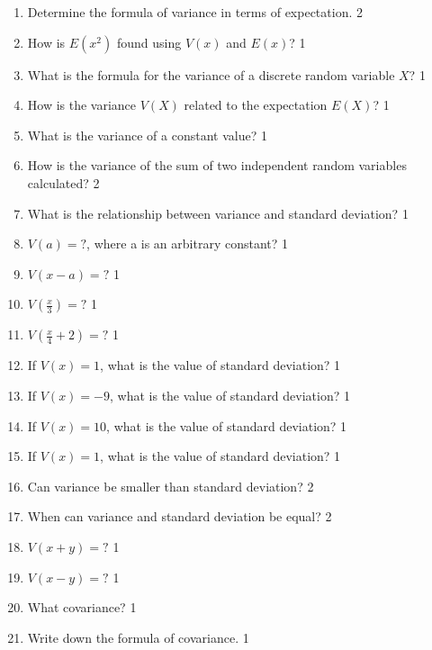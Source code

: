 \documentclass[a4paper,oneside]{book}
\begin{document}
\begin{enumerate}
 \item Determine the formula of variance in terms of expectation. \hfill 2

\item How is \( E(x^2) \) found using \( V(x) \) and \( E(x) \)? \hfill 1

\item What is the formula for the variance of a discrete random variable \( X \)? \hfill 1

\item How is the variance \( V(X) \) related to the expectation \( E(X) \)? \hfill 1

\item What is the variance of a constant value? \hfill 1

\item How is the variance of the sum of two independent random variables calculated? \hfill 2

\item What is the relationship between variance and standard deviation? \hfill 1

\item $V(a) = ?$, where a is an arbitrary constant?  \hfill 1

\item $V(x-a) = ?$  \hfill 1

\item $V(\frac x3) = ?$  \hfill 1

\item $V(\frac x4 + 2) = ?$  \hfill 1

\item If $V(x) = 1$, what is the value of standard deviation? \hfill 1

\item If $V(x) = -9$, what is the value of standard deviation? \hfill 1

\item If $V(x) = 10$, what is the value of standard deviation? \hfill 1

\item If $V(x) = 1$, what is the value of standard deviation? \hfill 1

\item Can variance be smaller than standard deviation? \hfill 2

\item When can variance and standard deviation be equal? \hfill 2

\item $V(x + y)=?$ \hfill 1

\item $V(x - y)=?$ \hfill 1

\item What covariance? \hfill 1

\item Write down the formula of covariance. \hfill 1


\end{enumerate}
\end{document}
